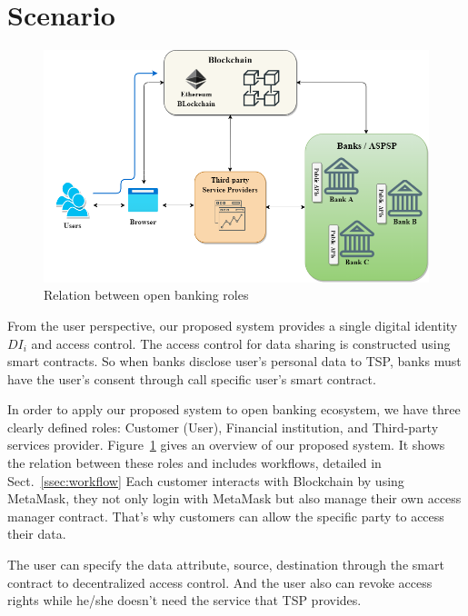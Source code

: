     \newpage    
\section{Scenario}
    \begin{figure}[htb]
        \centering
        \includegraphics[height=!,width=1\linewidth,keepaspectratio=true]{figures/system architecture-banks.png}
        \caption{{\footnotesize Relation between open banking roles}}
        \label{fig:relation}
    \end{figure}
        From the user perspective, our proposed system provides a single digital identity \(DI_i\) and access control. The access control for data sharing is constructed using smart contracts. So when banks disclose user's personal data to TSP, banks must have the user's consent through call specific user's smart contract. \par
        In order to apply our proposed system to open banking ecosystem, we have three clearly defined roles: Customer (User), Financial institution, and Third-party services provider. Figure~\ref{fig:relation} gives an overview of our proposed system. It shows the relation between these roles and includes workflows, detailed in Sect.~\ref{ssec:workflow} Each customer interacts with Blockchain by using MetaMask, they not only login with MetaMask but also manage their own access manager contract. That's why customers can allow the specific party to access their data.\par
        The user can specify the data attribute, source, destination through the smart contract to decentralized access control. And the user also can revoke access rights while he/she doesn't need the service that TSP provides.\par
        
